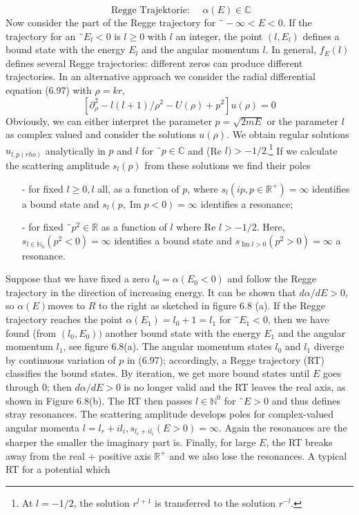 \begin{equation}
    \text { Regge Trajektorie: } \quad \alpha(E) \in \mathbb{C}
    \end{equation}
Now consider the part of the Regge trajectory for $¨ -\infty <E <0$. If the trajectory for an $¨E_l <0$ is $l\geq 0$ with $l$ an integer, the point $(l, E_l)$ defines a bound state with the energy $E_l$ and the angular momentum $l$. In general, $f_E (l)$ defines several Regge trajectories: different zeros can produce different trajectories.
In an alternative approach we consider the radial differential equation (6.97) with $\rho = kr$,
\begin{equation}
    \left[\partial_{\rho}^{2}-l(l+1) / \rho^{2}-U(\rho)+p^{2}\right] u(\rho)=0
    \end{equation}
Obviously, we can either interpret the parameter $p = \sqrt{2m E}$ or the parameter $l$ as complex valued and consider the solutions $u (\rho)$. We obtain regular solutions $u_{l, p (rho)}$ analytically in $p$ and $l$ for $¨ p \in\mathbb{C}$ and (Re $ l)> -1/2$.\footnote{At $l = -1/2$, the solution $r^{l + 1}$ is transferred to the solution $r^{-l}$.} If we calculate the scattering amplitude $s_l (p)$ from these solutions we find their poles
\begin{enumerate}
    \item[-] for fixed $l\geq 0, l$ all, as a function of $p$, where $s_l (ip, p \in\mathbb{R}^+) = \infty$ identifies a bound state and $s_l (p, \operatorname{Im } p ​​<0) = \infty$ identifies a resonance;
    \item[-] for fixed $¨ p^2 \in \mathbb{R}$ as a function of $l$ where Re $l> -1/2$. Here, $s_{l\in\mathbb{N}_0}(p^2<0)=\infty$ identifies a bound state and $s_{\operatorname{Im }l>0}(p^2>0)=\infty$ a resonance.
\end{enumerate}
Suppose that we have fixed a zero $l_0 = \alpha (E_0 <0)$ and follow the Regge trajectory in the direction of increasing energy. It can be shown that $d\alpha / dE> 0$, so $\alpha (E)$moves to $R$ to the right as sketched in figure 6.8 (a). If the Regge trajectory reaches the point $\alpha (E_1) = l_0 + 1 = l_1$ for $¨E_1 <0$, then we have found (from $(l_0, E_0))$ another bound state with the energy $E_1$ and the angular momentum $l_1$, see figure 6.8(a). The angular momentum states $l_0$ and $l_1$ diverge by continuous variation of $p$ in (6.97); accordingly, a Regge trajectory (RT) classifies the bound states. By iteration, we get more bound states until $E$ goes through $0$; then $d\alpha / dE> 0$ is no longer valid and the RT leaves the real axis, as shown in Figure 6.8(b). The RT then passes $l \in\mathbb{N}^0$ for $¨E> 0$ and thus defines stray resonances. The scattering amplitude develops poles for complex-valued angular momenta $l = l_r + il_i, s_{l_r + il_i} (E> 0) = \infty$. Again the resonances are the sharper the smaller the imaginary part is. Finally, for large $E$, the RT breaks away from the real + positive axis $\mathbb{R}^+$ and we also lose the resonances. A typical RT for a potential which
